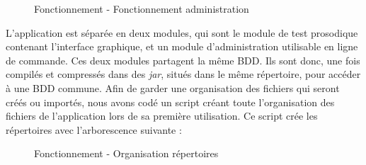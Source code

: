 \begin{figure}[!ht]
\begin{center}
  \caption{Fonctionnement - Fonctionnement administration}
  \label{seqenceAdmin} 
\end{center}
\end{figure}

\newpage
L'application est séparée en deux modules, qui sont le module de test prosodique contenant l'interface graphique, et un module d'administration utilisable en ligne de commande. Ces deux modules partagent la même BDD. Ils sont donc, une fois compilés et compressés dans des \textit{jar}, situés dans le même répertoire, pour accéder à une BDD commune. Afin de garder une organisation des fichiers qui seront créés ou importés, nous avons codé un script créant toute l'organisation des fichiers de l'application lors de sa première utilisation. Ce script crée les répertoires avec l'arborescence suivante :

\begin{figure}[!ht]
\begin{center}
  \caption{Fonctionnement - Organisation répertoires}
  \label{tree} 
\end{center}
\end{figure}


